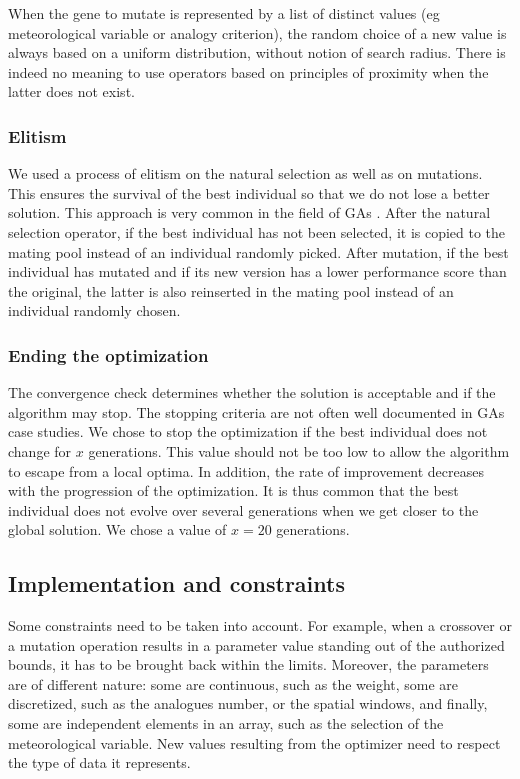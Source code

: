 \documentclass[twocol]{ametsoc}
\begin{document}
When the gene to mutate is represented by a list of distinct values (eg meteorological variable or analogy criterion), the random choice of a new value is always based on a uniform distribution, without notion of search radius. There is indeed no meaning to use operators based on principles of proximity when the latter does not exist.


\subsubsection{Elitism}

We used a process of elitism on the natural selection as well as on mutations. This ensures the survival of the best individual so that we do not lose a better solution. This approach is very common in the field of GAs \citep{Haupt2004}. After the natural selection operator, if the best individual has not been selected, it is copied to the mating pool instead of an individual randomly picked. After mutation, if the best individual has mutated and if its new version has a lower performance score than the original, the latter is also reinserted in the mating pool instead of an individual randomly chosen.


\subsubsection{Ending the optimization}

The convergence check determines whether the solution is acceptable and if the algorithm may stop. The stopping criteria are not often well documented in GAs case studies. We chose to stop the optimization if the best individual does not change for $x$ generations. This value should not be too low to allow the algorithm to escape from a local optima. In addition, the rate of improvement decreases with the progression of the optimization. It is thus common that the best individual does not evolve over several generations when we get closer to the global solution. We chose a value of $x=20$ generations.


\subsection{Implementation and constraints}

Some constraints need to be taken into account. For example, when a crossover or a mutation operation results in a parameter value standing out of the authorized bounds, it has to be brought back within the limits. Moreover, the parameters are of different nature: some are continuous, such as the weight, some are discretized, such as the analogues number, or the spatial windows, and finally, some are independent elements in an array, such as the selection of the meteorological variable. New values resulting from the optimizer need to respect the type of data it represents.
\end{document}
